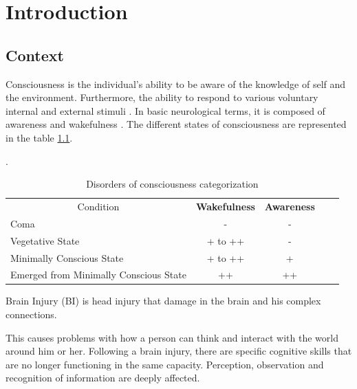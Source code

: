 \chapter{Introduction} \label{chap:intro}

\section*{Context} \label{sec:context} 

Consciousness is the individual's ability to be aware of the knowledge of self and the environment. Furthermore, the ability to respond to various voluntary internal and
external stimuli \citet{https://doi.org/10.1196/annals.1440.013}.
In basic neurological terms, it is composed of awareness and wakefulness \citet{zheng2017disentangling}.
The different states of consciousness are represented in the table
\ref{tab:my-table}.

\begin{table}[!htb].
\begin{tabular}{lccll}
\cline{3-3}
\multicolumn{1}{c}{{Condition}}             & \multicolumn{1}{l|}{\textbf{Wakefulness}} & \multicolumn{1}{l|}{\textbf{Awareness}} &  &  \\ \cline{3-3}
Coma                                            & -                                         & -                                       &  &  \\ \cline{1-3}
\multicolumn{1}{|l|}{Vegetative State}          & \multicolumn{1}{c|}{+ to ++}              & \multicolumn{1}{c|}{-}                  &  &  \\ \cline{1-3}
\multicolumn{1}{|l|}{Minimally Conscious State} & \multicolumn{1}{c|}{+ to ++}              & \multicolumn{1}{c|}{+}                  &  &  \\ \cline{1-3}
Emerged from Minimally Conscious State          & ++                                        & ++                                      &  & 
\end{tabular}
\caption{Disorders of consciousness categorization}
\label{tab:my-table}
\end{table}
\vspace{0.2cm}
Brain Injury (BI)  is head injury that damage in the brain and his complex connections. 

This causes
problems with how a person can
think and interact with the world around
him or her. Following a brain injury, there are
specific cognitive skills that are no
longer functioning in the same capacity.
Perception, observation and
recognition of information are deeply affected.

